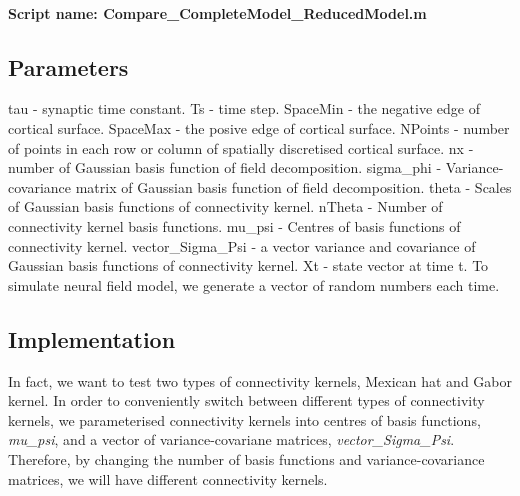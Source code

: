 \documentclass[a4paper, 12pt, english]{article}
\begin{document}
\paragraph{Script name: Compare\_CompleteModel\_ReducedModel.m}

\subsection{Parameters}

tau - synaptic time constant.\newline
Ts - time step.\newline
SpaceMin - the negative edge of cortical surface.\newline
SpaceMax - the posive edge of cortical surface.\newline
NPoints - number of points in each row or column of spatially discretised cortical surface.\newline
nx - number of Gaussian basis function of field decomposition.\newline
sigma\_phi - Variance-covariance matrix of Gaussian basis function of field decomposition.\newline
theta - Scales of Gaussian basis functions of connectivity kernel.\newline
nTheta - Number of connectivity kernel basis functions.\newline
mu\_psi - Centres of basis functions of connectivity kernel.\newline
vector\_Sigma\_Psi - a vector variance and covariance of Gaussian basis functions of connectivity kernel.\newline
Xt - state vector at time t.
To simulate neural field model, we generate a vector of random numbers each time.

\subsection{Implementation}
In fact, we want to test two types of connectivity kernels, Mexican hat and Gabor kernel.
In order to conveniently switch between different types of connectivity kernels,
we parameterised connectivity kernels into centres of basis functions, \textit{mu\_psi},
and a vector of variance-covariane matrices, \textit{vector\_Sigma\_Psi}.
Therefore, by changing the number of basis functions and variance-covariance matrices,
we will have different connectivity kernels.
\end{document}
